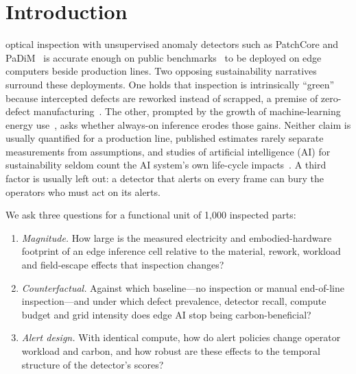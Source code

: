 \section{Introduction}
 optical inspection with unsupervised anomaly detectors such as PatchCore and PaDiM~\cite{roth2022patchcore,defard2021padim} is accurate enough on public benchmarks~\cite{bergmann2021mvtec} to be deployed on edge computers beside production lines. Two opposing sustainability narratives surround these deployments. One holds that inspection is intrinsically ``green'' because intercepted defects are reworked instead of scrapped, a premise of zero-defect manufacturing~\cite{psarommatis2019zero,azamfirei2023automation}. The other, prompted by the growth of machine-learning energy use~\cite{strubell2020energy,desislavov2023trends}, asks whether always-on inference erodes those gains. Neither claim is usually quantified for a production line, published estimates rarely separate measurements from assumptions, and studies of artificial intelligence (AI) for sustainability seldom count the AI system's own life-cycle impacts~\cite{ligozat2022unraveling}. A third factor is usually left out: a detector that alerts on every frame can bury the operators who must act on its alerts.

We ask three questions for a functional unit of 1{,}000 inspected parts:
\begin{enumerate}
\item \emph{Magnitude.} How large is the measured electricity and embodied-hardware footprint of an edge inference cell relative to the material, rework, workload and field-escape effects that inspection changes?
\item \emph{Counterfactual.} Against which baseline---no inspection or manual end-of-line inspection---and under which defect prevalence, detector recall, compute budget and grid intensity does edge AI stop being carbon-beneficial?
\item \emph{Alert design.} With identical compute, how do alert policies change operator workload and carbon, and how robust are these effects to the temporal structure of the detector's scores?
\end{enumerate}

